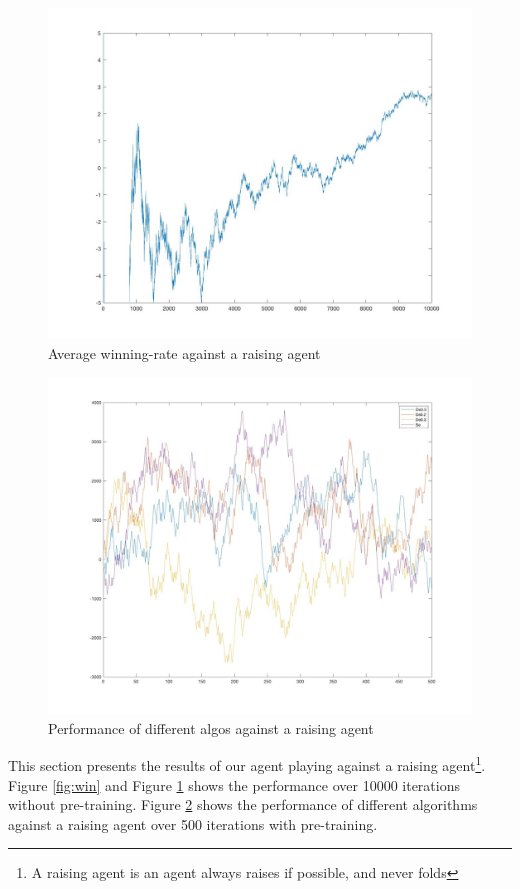 \documentclass{article}
\begin{document}
\begin{figure}[hbt!]
\centering
\includegraphics[scale=0.1]{average.jpg}
\caption{\label{fig:average}Average winning-rate against a raising agent}
\end{figure}

\begin{figure}[hbt!]
\centering
\includegraphics[scale=0.12]{500games.jpg}
\caption{\label{fig:500games}Performance of different algos against a raising agent}
\end{figure}
This section presents the results of our agent playing against a raising agent\footnote{A raising agent is an agent always raises if possible, and never folds}. Figure \ref{fig:win} and Figure \ref{fig:average} shows the performance over 10000 iterations without pre-training. Figure \ref{fig:500games} shows the performance of different algorithms against a raising agent over 500 iterations with pre-training.
\end{document}
